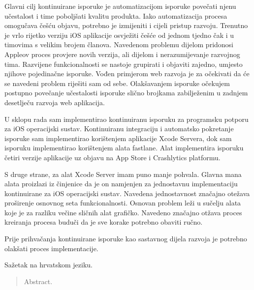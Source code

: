 \documentclass[times, utf8, diplomski, numeric]{fer}
\begin{document}
Glavni cilj kontinuirane isporuke je automatizacijom isporuke povečati njenu učestalost i time poboljšati kvalitu produkta. Iako automatizacija procesa omogučava češću objavu, potrebno je izmijeniti i cijeli pristup razvoju. Trenutno je vrlo rijetko verziju iOS aplikacije osvježiti češće od jednom tjedno čak i u timovima s velikim brojem članova. Navedenom problemu dijelom pridonosi Appleov proces provjere novih verzija, ali dijelom i nerazumijevanje razvojnog tima. Razvijene funkcionalnosti se nastoje grupirati i objaviti zajedno, umjesto njihove pojedinačne isporuke. Vođen primjerom web razvoja je za očekivati da će se navedeni problem riješiti sam od sebe. Olakšavanjem isporuke očekujem postupno povečanje učestalosti isporuke slično brojkama zabilježenim u zadnjem desetlječu razvoja web aplikacija.

U sklopu rada sam implementirao kontinuiranu isporuku za programsku potporu za iOS operacijski sustav. Kontinuiranu integraciju i automatsko pokretanje isporuke sam implementirao korištenjem aplikacije Xcode Servera, dok sam isporuku implementirao korištenjem alata fastlane. Alat implementira isporuku četiri verzije aplikacije uz objavu na App Store i Crashlytics platformu.

S druge strane, za alat Xcode Server imam puno manje pohvala. Glavna mana alata proizlazi iz činjenice da je on namjenjen za jednostavnu implementaciju kontinuirane za iOS operacijski sustav. Navedena jednostavnost značajno otežava proširenje osnovnog seta funkcionalnosti. Osnovan problem leži u sučelju alata koje je za razliku večine sličnih alat grafičko. Navedeno značajno otžava proces kreiranja procesa buduči da je sve korake potrebno obaviti ručno.

Prije prihvačanja kontinuirane isporuke kao sastavnog dijela razvoja je potrebno olakšati proces implementacije.







\begin{sazetak}
Sažetak na hrvatskom jeziku.

\end{sazetak}

\begin{abstract}
Abstract.

\end{abstract}
\end{document}
